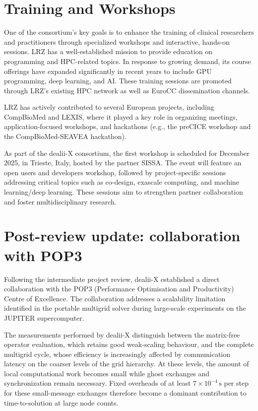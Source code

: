 \documentclass[a4paper,12pt]{article}
\begin{document}
\section{Training and Workshops}

One of the consortium’s key goals is to enhance the training of clinical
researchers and practitioners through specialized workshops and interactive,
hands-on sessions. LRZ has a well-established mission to provide education on
programming and HPC-related topics. In response to growing demand, its course
offerings have expanded significantly in recent years to include GPU
programming, deep learning, and AI. These training sessions are promoted
through LRZ’s existing HPC network as well as EuroCC dissemination channels.

LRZ has actively contributed to several European projects, including
CompBioMed and LEXIS, where it played a key role in organizing meetings,
application-focused workshops, and hackathons (e.g., the preCICE workshop and
the CompBioMed-SEAVEA hackathon).

As part of the dealii-X consortium, the first workshop is scheduled for
December 2025, in Trieste, Italy, hosted by the partner SISSA. The event will
feature an open users and developers workshop, followed by project-specific
sessions addressing critical topics such as co-design, exascale computing, and
machine learning/deep learning. These sessions aim to strengthen partner
collaboration and foster multidisciplinary research.


\section{Post-review update: collaboration with POP3}
\label{sec:pop3}

Following the intermediate project review, dealii-X established a direct
collaboration with the POP3 (Performance Optimisation and Productivity)
Centre of Excellence. The collaboration addresses a scalability limitation
identified in the portable multigrid solver during large-scale experiments
on the JUPITER supercomputer.

The measurements performed by dealii-X distinguish between the matrix-free
operator evaluation, which retains good weak-scaling behaviour, and the
complete multigrid cycle, whose efficiency is increasingly affected by
communication latency on the coarser levels of the grid hierarchy. At these
levels, the amount of local computational work becomes small while ghost
exchanges and synchronization remain necessary. Fixed overheads of at least
$7\times10^{-4}\,\mathrm{s}$ per step for these small-message exchanges
therefore become a dominant contribution to time-to-solution at large node
counts.
\end{document}
